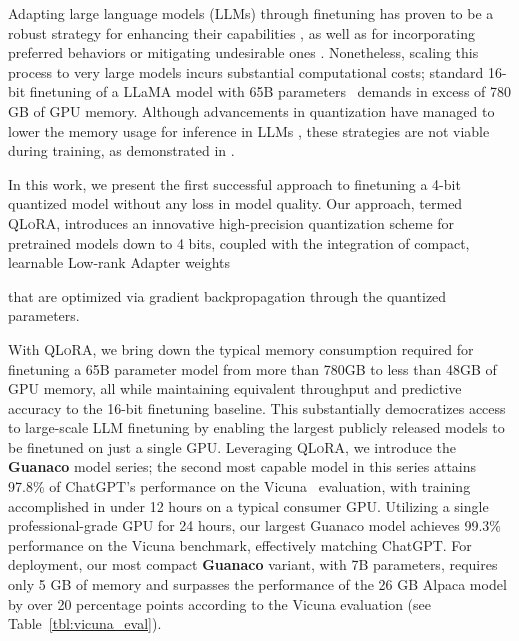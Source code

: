 Adapting large language models (LLMs) through finetuning has proven to be a robust strategy for enhancing their capabilities \citep{min2021metaicl, wei2021finetuned, ouyang2022training, wang2022super, wang2022self, liu2022few}, as well as for incorporating preferred behaviors or mitigating undesirable ones \citep{ouyang2022training,askell2021general,bai2022training}. Nonetheless, scaling this process to very large models incurs substantial computational costs; standard 16-bit finetuning of a LLaMA model with 65B parameters~\citep{touvron2023llama} demands in excess of 780 GB of GPU memory. Although advancements in quantization have managed to lower the memory usage for inference in LLMs \citep{dettmers2022llm, dettmers2022case, frantar2022gptq, xiao2022smoothquant}, these strategies are not viable during training, as demonstrated in \citep{wortsman2023stable}.

In this work, we present the first successful approach to finetuning a 4-bit quantized model without any loss in model quality. Our approach, termed \textsc{QLoRA}, introduces an innovative high-precision quantization scheme for pretrained models down to 4 bits, coupled with the integration of compact, learnable Low-rank Adapter weights \citep{hu2021lora}

that are optimized via gradient backpropagation through the quantized parameters.

With \textsc{QLoRA}, we bring down the typical memory consumption required for finetuning a 65B parameter model from more than 780GB to less than 48GB of GPU memory, all while maintaining equivalent throughput and predictive accuracy to the 16-bit finetuning baseline. This substantially democratizes access to large-scale LLM finetuning by enabling the largest publicly released models to be finetuned on just a single GPU. Leveraging \textsc{QLoRA}, we introduce the \textbf{Guanaco} model series; the second most capable model in this series attains 97.8\% of ChatGPT’s performance on the Vicuna~\citep{vicuna2023} evaluation, with training accomplished in under 12 hours on a typical consumer GPU. Utilizing a single professional-grade GPU for 24 hours, our largest Guanaco model achieves 99.3\% performance on the Vicuna benchmark, effectively matching ChatGPT. For deployment, our most compact \textbf{Guanaco} variant, with 7B parameters, requires only 5 GB of memory and surpasses the performance of the 26 GB Alpaca model by over 20 percentage points according to the Vicuna evaluation (see Table~\ref{tbl:vicuna_eval}).

